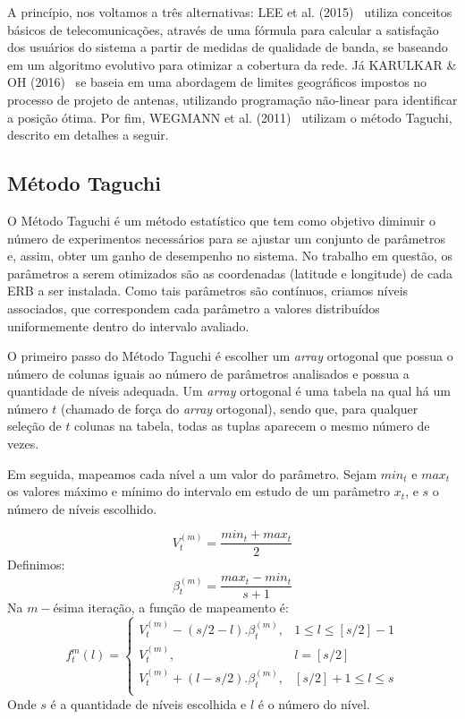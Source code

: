 \documentclass[]{politex}
\begin{document}
A princípio, nos voltamos a três alternativas: LEE et al. (2015)~
\cite{evolutivo} utiliza conceitos básicos de telecomunicações, através de uma
fórmula para calcular a satisfação dos usuários do sistema a partir de medidas
de qualidade de banda, se baseando em um algoritmo evolutivo para otimizar a
cobertura da rede. Já KARULKAR \& OH (2016)~\cite{nao-linear} se baseia em uma
abordagem de limites geográficos impostos no processo de projeto de antenas,
utilizando programação não-linear para identificar a posição ótima. Por fim,
WEGMANN et al. (2011)~\cite{taguchi} utilizam o método Taguchi, descrito em
detalhes a seguir.

\subsection{Método Taguchi}

O Método Taguchi é um método estatístico que tem como objetivo diminuir o número
de experimentos necessários para se ajustar um conjunto de parâmetros e, assim,
obter um ganho de desempenho no sistema. No trabalho em questão, os parâmetros a
serem otimizados são as coordenadas (latitude e longitude) de cada ERB a ser
instalada. Como tais parâmetros são contínuos, criamos níveis associados, que
correspondem cada parâmetro a valores distribuídos uniformemente dentro do
intervalo avaliado.

O primeiro passo do Método Taguchi é escolher um \textit{array} ortogonal que
possua o número de colunas iguais ao número de parâmetros analisados e possua a
quantidade de níveis adequada. Um \textit{array} ortogonal é uma tabela na qual
há um número $t$ (chamado de força do \textit{array} ortogonal), sendo que, para
qualquer seleção de $t$ colunas na tabela, todas as tuplas aparecem o mesmo
número de vezes.

Em seguida, mapeamos cada nível a um valor do parâmetro. Sejam $min_t$ e $max_t$
os valores máximo e mínimo do intervalo em estudo de um parâmetro $x_t$, e $s$ o
número de níveis escolhido.

\begin{equation*}
    V_t^{(m)}=\frac{min_t+max_t}{2}
\end{equation*}
Definimos:
\begin{equation*}
    \beta_t^{(m)} = \frac{max_t-min_t}{s+1}
\end{equation*}
Na $m-$ésima iteração, a função de mapeamento é:
\begin{equation*}
    f_t^m(l) =
    \begin{cases}
        V_t^{(m)} - (s/2 - l).\beta_t^{(m)}, & 1 \leq l \leq [s/2] - 1 \\
        V_t^{(m)}, &  l = [s/2]\\
        V_t^{(m)} + (l - s/2).\beta_t^{(m)}, & [s/2] + 1 \leq l \leq s \\
    \end{cases}
\end{equation*}
Onde $s$ é a quantidade de níveis escolhida e $l$ é o número do nível.
\end{document}
